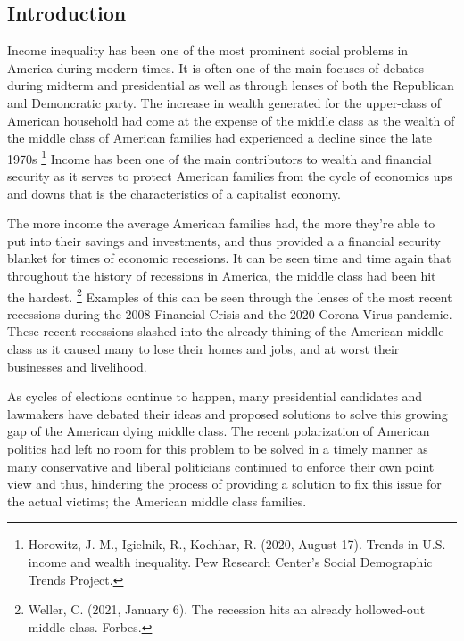 \documentclass[12pt]{article}
\begin{document}
\begin{multicols*}{2}
\section{Introduction}
\hspace*{5mm} Income inequality has been one of the most prominent social problems in America during modern times. It is often one of the main focuses of debates
during midterm and presidential as well as through lenses of both the Republican and Demoncratic party. The increase in wealth generated for the upper-class
of American household had come at the expense of the middle class as the wealth of the middle class of American families had experienced a decline since the late 1970s
\footnote[1]{Horowitz, J. M., Igielnik, R.,  Kochhar, R. (2020, August 17). Trends in U.S. income and wealth inequality. Pew Research Center's Social Demographic Trends Project.}
Income has been one of the main contributors to wealth and financial security as it serves to protect American families from the cycle of economics ups and downs that is
the characteristics of a capitalist economy.

\hspace*{5mm} The more income the average American families had, the more they're able to put into their savings and investments, and 
thus provided a a financial security blanket for times of economic recessions. It can be seen time and time again that throughout the history of recessions in America,
the middle class had been hit the hardest. \footnote[2]{Weller, C. (2021, January 6). The recession hits an already hollowed-out middle class. Forbes.} Examples of this can be
seen through the lenses of the most recent recessions during the 2008 Financial Crisis and the 2020 Corona Virus pandemic. These recent recessions slashed into the already thining of the
American middle class as it caused many to lose their homes and jobs, and at worst their businesses and livelihood. 

\hspace*{5mm} As cycles of elections continue to happen, many presidential candidates and lawmakers have debated their ideas and proposed solutions to solve
this growing gap of the American dying middle class. The recent polarization of American politics had left no room for this problem 
to be solved in a timely manner as many conservative and liberal politicians continued to enforce their own point view and thus, hindering the process of providing
a solution to fix this issue for the actual victims; the American middle class families. 


\end{multicols*}
\end{document}
